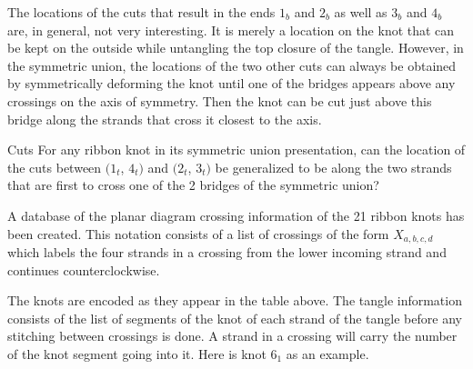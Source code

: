 \begin{paper}
The locations of the cuts that result in the ends $1_b$ and $2_b$ as well as
$3_b$ and $4_b$ are, in general, not very interesting.
It is merely a location on the knot that can be kept on the outside while
untangling the top closure of the tangle.
However, in the symmetric union, the locations of the two other cuts can always
be obtained by symmetrically deforming the knot until one of the bridges appears
above any crossings on the axis of symmetry.
Then the knot can be cut just above this bridge along the strands that cross it
closest to the axis.

\newsavebox{\mirrorR}



\begin{paperquestion}{Cuts}
For any ribbon knot in its symmetric union presentation, can the location of the
cuts between $(1_t$, $4_t)$ and $(2_t$, $3_t)$ be generalized to be along the
two strands that are first to cross one of the 2 bridges of the symmetric union?
\end{paperquestion}


A database of the planar diagram crossing information of the 21 ribbon
knots has been created.
This notation consists of a list of crossings of the form $X_{a,b,c,d}$ which
labels the four strands in a crossing from the lower incoming strand and
continues counterclockwise.

\vspace{1em}

The knots are encoded as they appear in the table above.
The tangle information consists of the list of segments of the knot of each
strand of the tangle before any stitching between crossings is done.
A strand in a crossing will carry the number of the knot segment going into it.
Here is knot $6_1$ as an example.


\end{paper}
